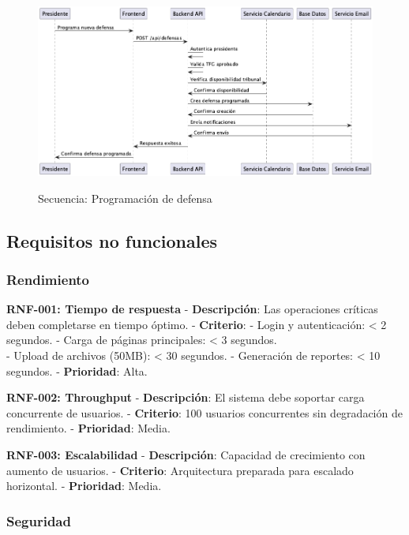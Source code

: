 \documentclass[12pt,a4paper,oneside]{report}
\providecommand{\pandocbounded}[1]{#1}
\begin{document}
\begin{figure}[H]
\centering
\pandocbounded{\includegraphics[keepaspectratio,alt={Secuencia: Programación de defensa}]{processed/images/04_analisis_sistema_plantuml_3.png}}
\caption{Secuencia: Programación de defensa}
\label{fig:secuencia-programacion-defensa}
\end{figure}

\subsection{Requisitos no funcionales}\label{requisitos-no-funcionales}

\subsubsection{Rendimiento}\label{rendimiento}

\textbf{RNF-001: Tiempo de respuesta} - \textbf{Descripción}: Las
operaciones críticas deben completarse en tiempo óptimo. -
\textbf{Criterio}: - Login y autenticación: \textless{} 2 segundos. -
Carga de páginas principales: \textless{} 3 segundos.\\
- Upload de archivos (50MB): \textless{} 30 segundos. - Generación de
reportes: \textless{} 10 segundos. - \textbf{Prioridad}: Alta.

\textbf{RNF-002: Throughput} - \textbf{Descripción}: El sistema debe
soportar carga concurrente de usuarios. - \textbf{Criterio}: 100
usuarios concurrentes sin degradación de rendimiento. -
\textbf{Prioridad}: Media.

\textbf{RNF-003: Escalabilidad} - \textbf{Descripción}: Capacidad de
crecimiento con aumento de usuarios. - \textbf{Criterio}: Arquitectura
preparada para escalado horizontal. - \textbf{Prioridad}: Media.

\subsubsection{Seguridad}\label{seguridad}
\end{document}
